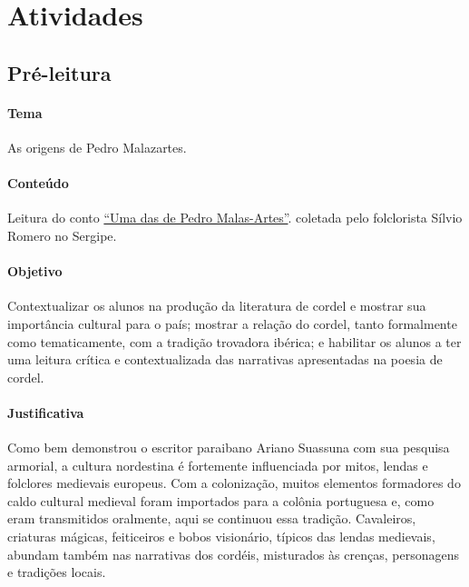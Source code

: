 \documentclass[11pt]{extarticle}
\begin{document}
\section{Atividades}

\subsection{Pré-leitura}



\paragraph{Tema} As origens de Pedro Malazartes.

\paragraph{Conteúdo} Leitura do conto \href{https://pt.wikisource.org/wiki/Contos_Populares_do_Brazil/Uma_de_Pedro_Malas-Artes}{``Uma das de Pedro Malas-Artes''}. coletada pelo folclorista Sílvio Romero no Sergipe.

\paragraph{Objetivo} Contextualizar os alunos na produção da literatura de cordel e mostrar sua importância cultural para o país; mostrar a relação do cordel, tanto formalmente como tematicamente, com a tradição trovadora ibérica; e habilitar os alunos a ter uma leitura crítica e contextualizada das narrativas apresentadas na poesia de cordel.

\paragraph{Justificativa} Como bem demonstrou o escritor paraibano Ariano Suassuna com sua pesquisa armorial, a cultura nordestina é fortemente influenciada por mitos, lendas e folclores medievais europeus. Com a colonização, muitos elementos formadores do caldo cultural medieval foram importados para a colônia portuguesa e, como eram transmitidos oralmente, aqui se continuou essa tradição. Cavaleiros, criaturas mágicas, feiticeiros e bobos visionário, típicos das lendas medievais, abundam também nas narrativas dos cordéis, misturados às crenças, personagens e tradições locais.
\end{document}
